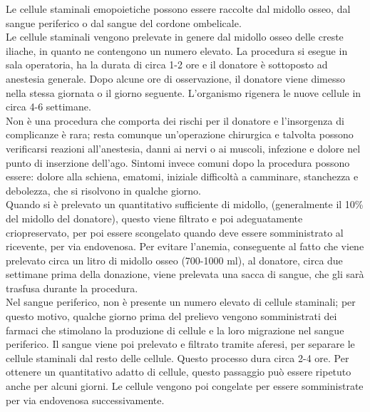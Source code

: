 Le cellule staminali emopoietiche possono essere raccolte dal midollo osseo, dal sangue periferico o dal sangue del 
cordone ombelicale.\\ 
Le cellule staminali vengono prelevate in genere dal midollo osseo delle creste iliache, in quanto ne contengono un 
numero elevato. La procedura si esegue in sala operatoria, ha la durata di circa 1-2 ore e il donatore è sottoposto 
ad anestesia generale. Dopo alcune ore di osservazione, il donatore viene dimesso nella stessa giornata
o il giorno seguente. L’organismo rigenera le nuove cellule in circa 4-6 settimane.\\ 
Non è una procedura che comporta dei rischi per il donatore e l’insorgenza di complicanze è rara; resta comunque 
un’operazione chirurgica e talvolta possono verificarsi reazioni all’anestesia, danni ai 
nervi o ai muscoli, infezione e dolore nel punto di inserzione dell’ago. 
Sintomi invece comuni dopo la procedura possono essere: dolore alla schiena, ematomi, iniziale difficoltà a camminare, 
stanchezza e debolezza, che si risolvono in qualche giorno.\\ 
Quando si è prelevato un quantitativo sufficiente di midollo, (generalmente il 10\% del midollo del donatore), 
questo viene filtrato e poi adeguatamente criopreservato, per poi essere scongelato quando deve essere somministrato 
al ricevente, per via endovenosa\cite{STEMCELLS}.
Per evitare l’anemia, conseguente al fatto che viene prelevato circa un litro di midollo osseo 
(700-1000 ml), al donatore, circa due settimane prima della donazione, viene prelevata una sacca di sangue, 
che gli sarà trasfusa durante la procedura\cite{TRAPIANTO}.\\

Nel sangue periferico, non è presente un numero elevato di cellule staminali; per questo motivo, qualche 
giorno prima del prelievo vengono somministrati dei farmaci che stimolano  la produzione di cellule e la loro 
migrazione nel sangue periferico. Il sangue viene poi prelevato e filtrato tramite aferesi, per separare le cellule 
staminali dal resto delle cellule. Questo  processo dura circa 2-4 ore. Per ottenere un quantitativo adatto di cellule,
questo passaggio può essere ripetuto anche per alcuni giorni. 
Le cellule vengono poi congelate per essere somministrate per via endovenosa successivamente\cite{STEMCELLS}.\\


